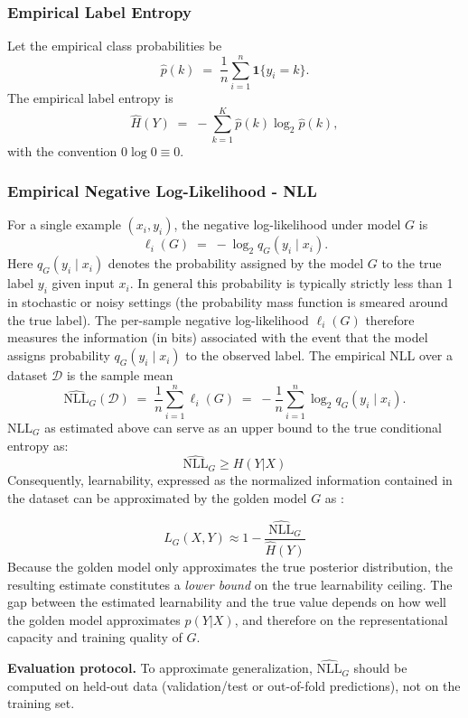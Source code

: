 \documentclass{article}
\begin{document}
\subsubsection{Empirical Label Entropy}
Let the empirical class probabilities be
\[
\hat p(k) \;=\; \frac{1}{n}\sum_{i=1}^{n}\mathbf{1}\{y_i=k\}.
\]
The empirical label entropy is
\[
\hat H(Y) \;=\; -\sum_{k=1}^{K}\hat p(k)\log_2 \hat p(k),
\]
with the convention $0\log 0 \equiv 0$.

\subsubsection{Empirical Negative Log-Likelihood - NLL}
For a single example $(x_i,y_i)$, the negative log-likelihood under model $G$ is
\[
\ell_i(G) \;=\; -\log_2 q_G(y_i\mid x_i).
\]
Here $q_G(y_i \mid x_i)$ denotes the probability assigned by the model $G$
to the true label $y_i$ given input $x_i$. In general this probability
is typically strictly less than 1 in stochastic or noisy settings (the probability mass function is smeared around the true label). 
The per-sample negative log-likelihood
$\ell_i(G)$ therefore measures the information (in bits) associated with
the event that the model assigns probability $q_G(y_i \mid x_i)$ to the
observed label.
The empirical NLL over a dataset $\mathcal{D}$ is the sample mean
\[
\widehat{\mathrm{NLL}}_G(\mathcal{D})
\;=\;
\frac{1}{n}\sum_{i=1}^{n} \ell_i(G)
\;=\;
-\frac{1}{n}\sum_{i=1}^{n}\log_2 q_G(y_i\mid x_i).
\]
$\widehat{\mathrm{NLL}}_G$ as estimated above can serve as an upper bound to the true conditional entropy as:
\[
\widehat{\mathrm{NLL}}_G \geq H(Y | X)
\]
Consequently, learnability, expressed as the normalized information contained in the dataset can be approximated by the 
golden model $G$ as :

\[
\boxed{
L_G(X,Y) \approx 1 - \frac{\widehat{\mathrm{NLL}}_G }{\hat H(Y) }
}
\]
Because the golden model only approximates the true posterior distribution, 
the resulting estimate constitutes a \textit{lower bound} on the true learnability ceiling. 
The gap between the estimated learnability and the true value depends on how well the golden model approximates $p(Y|X)$, 
and therefore on the representational capacity and training quality of $G$.

\textbf{Evaluation protocol.} To approximate generalization, $\widehat{\mathrm{NLL}}_G$ should be computed on held-out data (validation/test or out-of-fold predictions), not on the training set.
\end{document}
